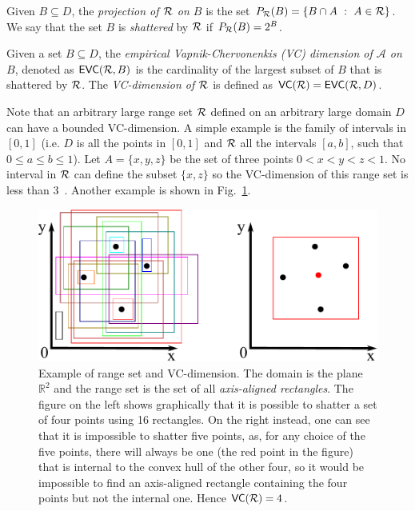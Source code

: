Given $B\subseteq D$, the \emph{projection of $\mathcal{R}$ on $B$} is the set
$P_{\mathcal{R}}(B)=\{ B\cap A ~:~ A\in\mathcal{R}\}$. We say that the set $B$ is
\emph{shattered} by $\mathcal{R}$ if $P_{\mathcal{R}}(B)=2^B$.

\begin{definition}\label{def:empvcdim}
  Given a set $B\subseteq D$, the \emph{empirical Vapnik-Chervonenkis
  (VC) dimension of $\mathcal{A}$ on $B$}, denoted as $\mathsf{EVC}(\mathcal{R},B)$ is
  the cardinality of the largest subset of $B$ that is shattered by
  $\mathcal{R}$. The \emph{VC-dimension of $\mathcal{R}$} is defined as $\mathsf{VC}(\mathcal{R})=\mathsf{EVC}(\mathcal{R},D)$.
\end{definition}

Note that an arbitrary large range set $\mathcal{R}$ defined on an arbitrary large
domain $D$ can have a bounded VC-dimension. A simple
example is the family of intervals in $[0,1]$ (i.e. $D$ is all the points in
$[0,1]$ and $\mathcal{R}$ all the intervals $[a,b]$, such that $0\leq a\leq b\leq 1$). Let
$A=\{x,y,z\}$ be the set of three points $0<x<y<z<1$. No interval in $\mathcal{R}$ can
define the subset $\{x,z\}$ so the VC-dimension of this range set is less than
3~\cite[Lemma 10.3.1]{Matousek02}. Another example is shown in
Fig.~\ref{fig:rectangles}.
\begin{figure}[ht]
  \centering
  \includegraphics[width=.7\textwidth,keepaspectratio]{rectangles}
  \caption{Example of range set and VC-dimension. The domain is the
  plane $\mathbb{R}^2$ and the range set is the set of all
  \emph{axis-aligned rectangles}. The figure on the left shows graphically that
  it is possible to shatter a set of four points using 16 rectangles. On the
  right instead, one can see that it is impossible to shatter five points, as,
  for any choice of the five points, there will always be one (the red point in
  the figure) that is internal to the convex hull of the other four, so it would
  be impossible to find an axis-aligned rectangle containing the four points
  but not the internal one. Hence $\mathsf{VC}(\mathcal{R})=4$.}
  \label{fig:rectangles}
\end{figure}

